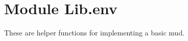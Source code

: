 %
%
%


\section{Module Lib.env}

    \label{Lib:env}
These are helper functions for implementing a basic mud.

